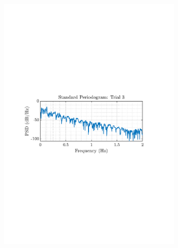 \documentclass[12pt]{article}
\begin{document}
\begin{figure}[H]
\begin{subfigure}{0.49\textwidth}
			\includegraphics[trim={2.2cm 11.2cm 3.15cm  11.2cm}, clip, width=\textwidth]{../MATLAB/figures/q1_5a_fig03.pdf} 
		\end{subfigure}
		\begin{subfigure}{0.49\textwidth}
			\centering

\end{subfigure}
\end{figure}
\end{document}
